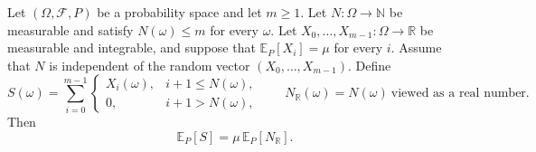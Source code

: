 \begin{theorem}
Let $(\Omega,\mathcal F,P)$ be a probability space and let $m\geq1$. Let
$N:\Omega\to\mathbb N$ be measurable and satisfy $N(\omega)\leq m$ for
every $\omega$. Let $X_0,\ldots,X_{m-1}:\Omega\to\mathbb R$ be measurable
and integrable, and suppose that $\mathbb E_P[X_i]=\mu$ for every $i$.
Assume that $N$ is independent of the random vector
$(X_0,\ldots,X_{m-1})$. Define
\[
 S(\omega)=\sum_{i=0}^{m-1}
 \begin{cases}
 X_i(\omega),&i+1\leq N(\omega),\\
 0,&i+1>N(\omega),
 \end{cases}
 \qquad
 N_{\mathbb R}(\omega)=N(\omega)\ \text{viewed as a real number}.
\]
Then
\[
 \mathbb E_P[S]=\mu\,\mathbb E_P[N_{\mathbb R}].
\]
\end{theorem}
